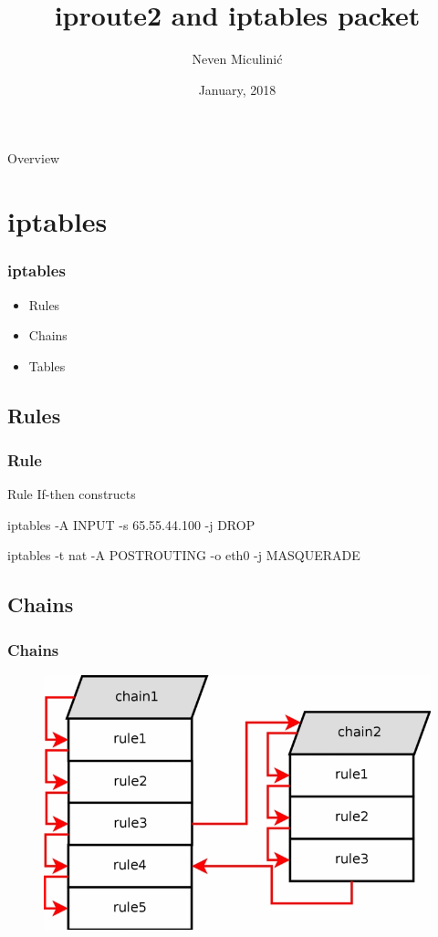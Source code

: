 \documentclass{beamer}
\title[]{iproute2 and iptables packet } %
\author{Neven Miculini\'{c}} %
\institute[FER] %
{
University of Zagreb \\
Faculty of Electrical Engineering and Computing\\
Seminar for Computer Forensics class\\
\medskip
\textit{neven.miculinic@fer.hr} %
}
\date{January, 2018} %
\begin{document}
\begin{frame}
\titlepage %
\end{frame}

\begin{frame}{Overview}
\tableofcontents
\end{frame}

\section{iptables}
\begin{frame}
\frametitle{iptables}
\begin{itemize}
\item Rules
\item Chains
\item Tables
\end{itemize}
\end{frame}

\subsection{Rules}

\begin{frame}
\frametitle{Rule}
\begin{block}{Rule}
If-then constructs
\end{block}
\begin{example}
iptables -A INPUT -s 65.55.44.100 -j DROP
\end{example}
\begin{example}
iptables -t nat -A POSTROUTING -o eth0 -j MASQUERADE
\end{example}
\end{frame}

\subsection{Chains}

\begin{frame}
\frametitle{Chains}
\begin{figure}
\includegraphics[width=\textwidth]{table_subtraverse}
\end{figure}
\end{frame}
\end{document}
